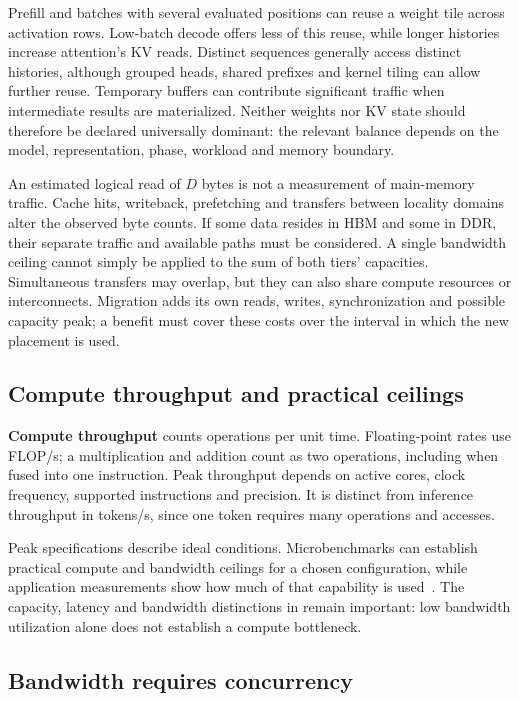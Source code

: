 Prefill and batches with several evaluated positions can reuse a weight
tile across activation rows.  Low-batch decode offers less of this
reuse, while longer histories increase attention's KV reads.  Distinct
sequences generally access distinct histories, although grouped heads,
shared prefixes and kernel tiling can allow further reuse.  Temporary
buffers can contribute significant traffic when intermediate results
are materialized.  Neither weights nor KV state should therefore be
declared universally dominant: the relevant balance depends on the
model, representation, phase, workload and memory boundary.

An estimated logical read of \(D\) bytes is not a measurement of
main-memory traffic.  Cache hits, writeback, prefetching and transfers
between locality domains alter the observed byte counts.  If some data
resides in HBM and some in DDR, their separate traffic and available
paths must be considered.  A single bandwidth ceiling cannot simply
be applied to the sum of both tiers' capacities.  Simultaneous transfers
may overlap, but they can also share compute resources or interconnects.
Migration adds its own reads, writes, synchronization and possible
capacity peak; a benefit must cover these costs over the interval in
which the new placement is used.

\subsection{Compute throughput and practical ceilings}

\textbf{Compute throughput} counts operations per unit time.  Floating-point
rates use FLOP/s; a multiplication and addition count as two operations,
including when fused into one instruction.  Peak throughput depends on
active cores, clock frequency, supported instructions and precision.
It is distinct from inference throughput in tokens/s, since one token
requires many operations and accesses.

Peak specifications describe ideal conditions.  Microbenchmarks can
establish practical compute and bandwidth ceilings for a chosen
configuration, while application measurements show how much of that
capability is used~\cite{nerscroofline2026}.  The capacity, latency and
bandwidth distinctions in  remain important:
low bandwidth utilization alone does not establish a compute bottleneck.

\subsection{Bandwidth requires concurrency}
\label{sec:littles-law}

